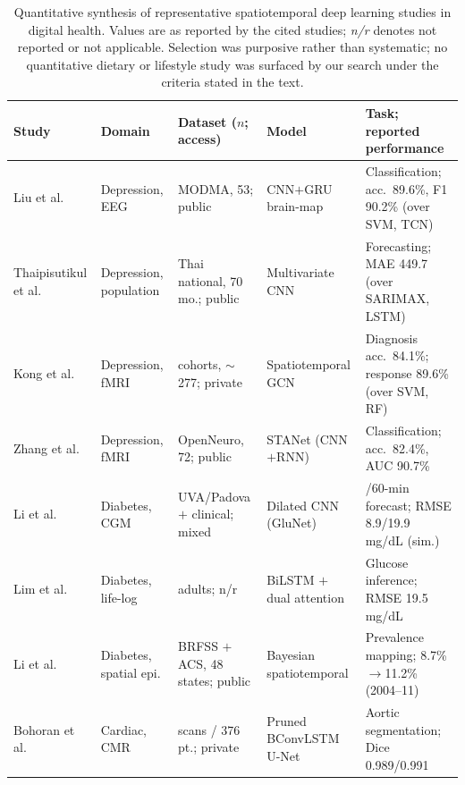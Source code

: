 \documentclass[journal]{IEEEtran}
\newif\ifsubmission
\begin{document}
\begin{table}[t]
\centering
\caption{Quantitative synthesis of representative spatiotemporal deep learning studies in digital health. Values are as reported by the cited studies; \emph{n/r} denotes not reported or not applicable. Selection was purposive rather than systematic; no quantitative dietary or lifestyle study was surfaced by our search under the criteria stated in the text.}
\label{tab:evidence}
\ifsubmission
\scriptsize
\setlength{\tabcolsep}{3pt}
\renewcommand{\arraystretch}{1.1}
\begin{tabularx}{\textwidth}{>{\raggedright\arraybackslash}p{2.5cm} >{\raggedright\arraybackslash}p{2.2cm} >{\raggedright\arraybackslash}p{2.9cm} >{\raggedright\arraybackslash}p{2.7cm} >{\raggedright\arraybackslash}X}
\toprule
\textbf{Study} & \textbf{Domain} & \textbf{Dataset ($n$; access)} & \textbf{Model} & \textbf{Task; reported performance} \\
\midrule
Liu et al.~\cite{2} & Depression, EEG & MODMA, 53; public & CNN$+$GRU brain-map & Classification; acc.\ 89.6\%, F1 90.2\% (over SVM, TCN) \\
\addlinespace[1pt]
Thaipisutikul et al.~\cite{3} & Depression, population & Thai national, 70 mo.; public & Multivariate CNN & Forecasting; MAE 449.7 (over SARIMAX, LSTM) \\
\addlinespace[1pt]
Kong et al.~\cite{4} & Depression, fMRI & 2 cohorts, $\sim$277; private & Spatiotemporal GCN & Diagnosis acc.\ 84.1\%; response 89.6\% (over SVM, RF) \\
\addlinespace[1pt]
Zhang et al.~\cite{9} & Depression, fMRI & OpenNeuro, 72; public & STANet (CNN$+$RNN) & Classification; acc.\ 82.4\%, AUC 90.7\% \\
\addlinespace[1pt]
Li et al.~\cite{Li2020GluNet} & Diabetes, CGM & UVA/Padova $+$ clinical; mixed & Dilated CNN (GluNet) & 30/60-min forecast; RMSE 8.9/19.9 mg/dL (sim.) \\
\addlinespace[1pt]
Lim et al.~\cite{Lim2025VirtualCGM} & Diabetes, life-log & 171 adults; n/r & BiLSTM $+$ dual attention & Glucose inference; RMSE 19.5 mg/dL \\
\addlinespace[1pt]
Li et al.~\cite{XiaoLi2016DiabetesSpatiotemporal} & Diabetes, spatial epi. & BRFSS $+$ ACS, 48 states; public & Bayesian spatiotemporal & Prevalence mapping; 8.7\%$\to$11.2\% (2004--11) \\
\addlinespace[1pt]
Bohoran et al.~\cite{5} & Cardiac, CMR & 424 scans / 376 pt.; private & Pruned BConvLSTM U-Net & Aortic segmentation; Dice 0.989/0.991 \\

\end{tabularx}
\end{table}
\end{document}
